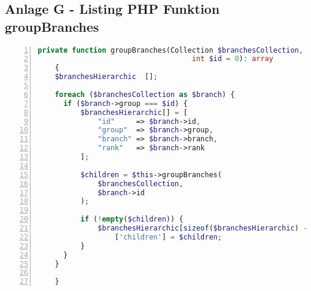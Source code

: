\subsection{Anlage G - Listing PHP Funktion \glqq groupBranches\grqq{}}
\vspace{1cm}
\begin{lstlisting}[language=PHP, numbers=left, tabsize=2]
    private function groupBranches(Collection $branchesCollection,
                                    int $id = 0): array
    {
    $branchesHierarchic  [];

    foreach ($branchesCollection as $branch) {
      if ($branch->group === $id) {
          $branchesHierarchic[] = [
              "id"     => $branch->id,
              "group"  => $branch->group,
              "branch" => $branch->branch,
              "rank"   => $branch->rank
          ];

          $children = $this->groupBranches(
              $branchesCollection,
              $branch->id
          );

          if (!empty($children)) {
              $branchesHierarchic[sizeof($branchesHierarchic) - 1]
                  ['children'] = $children;
          }
      }
    }

    }
\end{lstlisting}